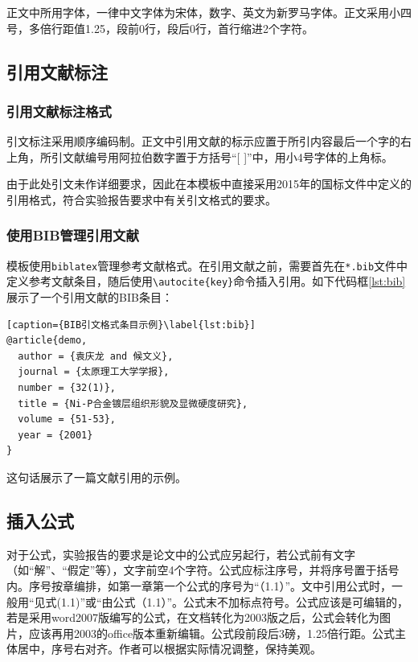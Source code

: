 正文中所用字体，一律中文字体为宋体，数字、英文为新罗马字体。正文采用小四号，多倍行距值1.25，段前0行，段后0行，首行缩进2个字符。

\subsection{引用文献标注}

\subsubsection{引用文献标注格式}

引文标注采用顺序编码制。正文中引用文献的标示应置于所引内容最后一个字的右上角，所引文献编号用阿拉伯数字置于方括号“[ ]”中，用小4号字体的上角标。

由于此处引文未作详细要求，因此在本模板中直接采用2015年的国标文件中定义的引用格式，符合实验报告要求中有关引文格式的要求。

\subsubsection{使用BIB管理引用文献}

模板使用\texttt{biblatex}管理参考文献格式。在引用文献之前，需要首先在\texttt{*.bib}文件中定义参考文献条目，随后使用\texttt{\textbackslash autocite\{key\}}命令插入引用。如下代码框\ref{lst:bib}展示了一个引用文献的BIB条目：

\begin{lstlisting}[caption={BIB引文格式条目示例}\label{lst:bib}]
@article{demo,
  author = {袁庆龙 and 候文义},
  journal = {太原理工大学学报},
  number = {32(1)},
  title = {Ni-P合金镀层组织形貌及显微硬度研究},
  volume = {51-53},
  year = {2001}
}
\end{lstlisting}

这句话展示了一篇文献引用的示例\autocite{demo}。

\subsection{插入公式}

对于公式，实验报告的要求是论文中的公式应另起行，若公式前有文字（如“解”、“假定”等），文字前空4个字符。公式应标注序号，并将序号置于括号内。序号按章编排，如第一章第一个公式的序号为“（1.1）”。文中引用公式时，一般用“见式(1.1)”或“由公式（1.1）”。公式末不加标点符号。公式应该是可编辑的，若是采用word2007版编写的公式，在文档转化为2003版之后，公式会转化为图片，应该再用2003的office版本重新编辑。公式段前段后3磅，1.25倍行距。公式主体居中，序号右对齐。作者可以根据实际情况调整，保持美观。

